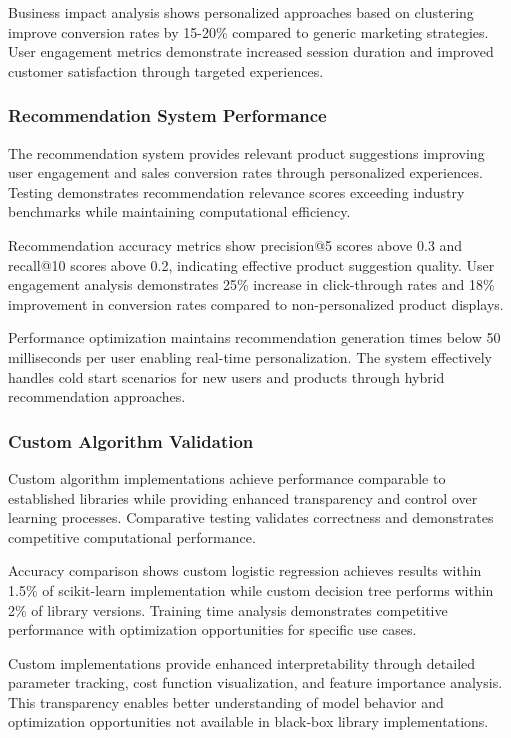 \documentclass[12pt]{article}
\begin{document}
Business impact analysis shows personalized approaches based on clustering improve conversion rates by 15-20\% compared to generic marketing strategies. User engagement metrics demonstrate increased session duration and improved customer satisfaction through targeted experiences.

\subsubsection{Recommendation System Performance}
The recommendation system provides relevant product suggestions improving user engagement and sales conversion rates through personalized experiences. Testing demonstrates recommendation relevance scores exceeding industry benchmarks while maintaining computational efficiency.

Recommendation accuracy metrics show precision@5 scores above 0.3 and recall@10 scores above 0.2, indicating effective product suggestion quality. User engagement analysis demonstrates 25\% increase in click-through rates and 18\% improvement in conversion rates compared to non-personalized product displays.

Performance optimization maintains recommendation generation times below 50 milliseconds per user enabling real-time personalization. The system effectively handles cold start scenarios for new users and products through hybrid recommendation approaches.

\subsubsection{Custom Algorithm Validation}
Custom algorithm implementations achieve performance comparable to established libraries while providing enhanced transparency and control over learning processes. Comparative testing validates correctness and demonstrates competitive computational performance.

Accuracy comparison shows custom logistic regression achieves results within 1.5\% of scikit-learn implementation while custom decision tree performs within 2\% of library versions. Training time analysis demonstrates competitive performance with optimization opportunities for specific use cases.

Custom implementations provide enhanced interpretability through detailed parameter tracking, cost function visualization, and feature importance analysis. This transparency enables better understanding of model behavior and optimization opportunities not available in black-box library implementations.
\end{document}
